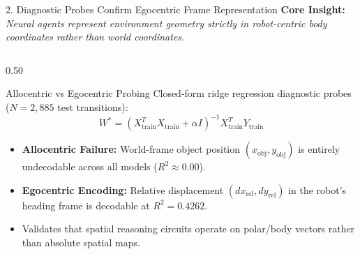 \documentclass[aspectratio=169, 10pt]{beamer}
\begin{document}
\begin{frame}{2. Diagnostic Probes Confirm Egocentric Frame Representation}
  \textbf{Core Insight:} \textit{Neural agents represent environment geometry strictly in robot-centric body coordinates rather than world coordinates.}

  \vspace{0.2cm}
  \begin{columns}[T]
    \begin{column}{0.50\textwidth}
      \begin{block}{Allocentric vs Egocentric Probing}
        \small
        Closed-form ridge regression diagnostic probes ($N=2,885$ test transitions):
        \begin{equation*}
          W^* = (X_{\mathrm{train}}^T X_{\mathrm{train}} + \alpha I)^{-1} X_{\mathrm{train}}^T Y_{\mathrm{train}}
        \end{equation*}
        \begin{itemize}
          \item \textbf{Allocentric Failure:} World-frame object position $(x_{\mathrm{obj}}, y_{\mathrm{obj}})$ is entirely undecodable across all models ($R^2 \approx 0.00$).
          \item \textbf{Egocentric Encoding:} Relative displacement $(dx_{\mathrm{rel}}, dy_{\mathrm{rel}})$ in the robot's heading frame is decodable at $R^2 = 0.4262$.
          \item Validates that spatial reasoning circuits operate on polar/body vectors rather than absolute spatial maps.
        \end{itemize}
      \end{block}
    \end{column}


\end{columns}
\end{frame}
\end{document}
